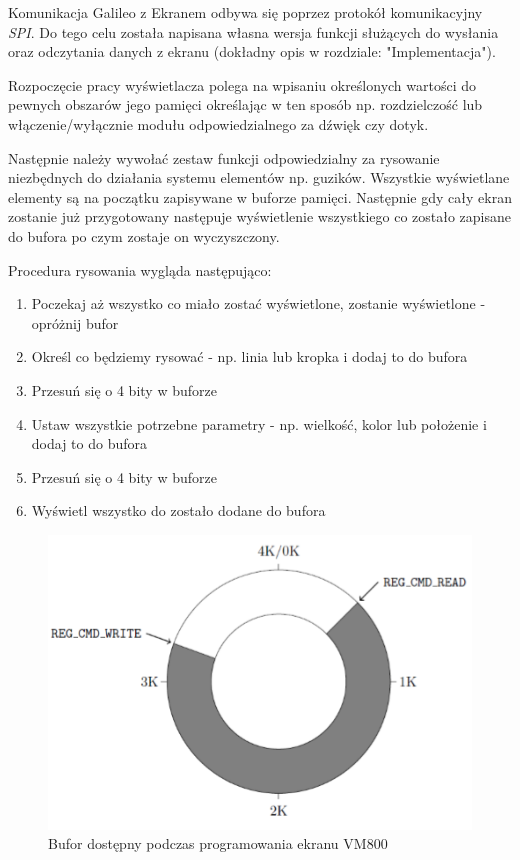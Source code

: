 \documentclass{xmgr}
\begin{document}
Komunikacja Galileo z Ekranem odbywa się poprzez protokół komunikacyjny \emph{SPI}. Do tego celu została napisana własna wersja funkcji służących do wysłania oraz odczytania danych z ekranu (dokładny opis w rozdziale: "Implementacja").

Rozpoczęcie pracy wyświetlacza polega na wpisaniu określonych wartości do pewnych obszarów jego pamięci określając w ten sposób np. rozdzielczość lub włączenie/wyłącznie modułu odpowiedzialnego za dźwięk czy dotyk. 

Następnie należy wywołać zestaw funkcji odpowiedzialny za rysowanie niezbędnych do działania systemu elementów np. guzików. Wszystkie wyświetlane elementy są na początku zapisywane w buforze pamięci. Następnie gdy cały ekran zostanie już przygotowany następuje wyświetlenie wszystkiego co zostało zapisane do bufora po czym zostaje on wyczyszczony.

Procedura rysowania wygląda następująco:
\begin{enumerate}
	\item Poczekaj aż wszystko co miało zostać wyświetlone, zostanie wyświetlone - opróżnij bufor
	\item Określ co będziemy rysować - np. linia lub kropka i dodaj to do bufora
	\item Przesuń się o 4 bity w buforze
	\item Ustaw wszystkie potrzebne parametry - np. wielkość, kolor lub położenie  i dodaj to do bufora
	\item Przesuń się o 4 bity w buforze
	\item Wyświetl wszystko do zostało dodane do bufora 
\end{enumerate}

\begin{figure}[!h]
    \centering
    \includegraphics[height=0.25\textheight]{images/buf.png}
    \caption{Bufor dostępny podczas programowania ekranu VM800}
\end{figure}
\end{document}
